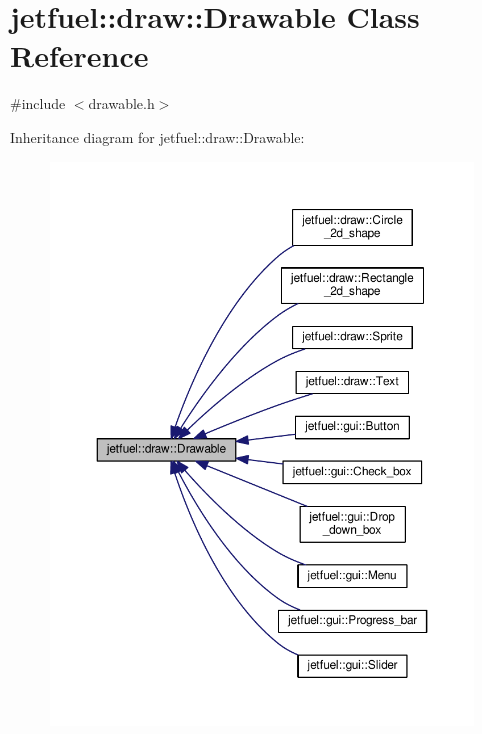 \hypertarget{classjetfuel_1_1draw_1_1Drawable}{}\section{jetfuel\+:\+:draw\+:\+:Drawable Class Reference}
\label{classjetfuel_1_1draw_1_1Drawable}


{\ttfamily \#include $<$drawable.\+h$>$}



Inheritance diagram for jetfuel\+:\+:draw\+:\+:Drawable\+:
\nopagebreak
\begin{figure}[H]
\begin{center}
\leavevmode
\includegraphics[width=350pt]{classjetfuel_1_1draw_1_1Drawable__inherit__graph}
\end{center}
\end{figure}
